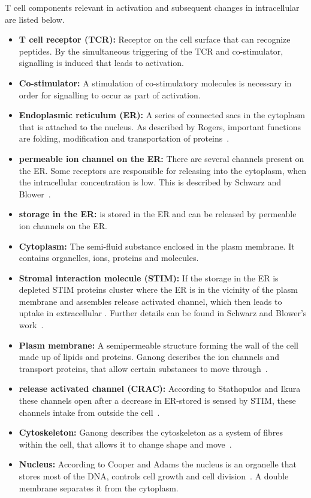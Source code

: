 T cell components relevant in activation and subsequent changes in intracellular \Calcium are listed below.

\begin{itemize}
	\item \textbf{T cell receptor (TCR):} Receptor on the cell surface that can recognize peptides. By the simultaneous triggering of the TCR and co-stimulator, signalling is induced that leads to activation.
	\item \textbf{Co-stimulator:} A stimulation of co-stimulatory molecules is necessary in order for signalling to occur as part of activation.
	\item \textbf{Endoplasmic reticulum (ER):} A series of connected sacs in the cytoplasm that is attached to the nucleus. As described by Rogers, important functions are folding, modification and transportation of proteins~\cite{Rogers2024}.
	\item \textbf{\Calcium permeable ion channel on the ER:} There are several \Calcium channels present on the ER. Some receptors are responsible for releasing \Calcium into the cytoplasm, when the intracellular \Calcium concentration is low. This is described by Schwarz and Blower~\cite{Schwarz2016}.
	\item \textbf{\Calcium storage in the ER:} \Calcium is stored in the ER and can be released by \Calcium permeable ion channels on the ER.
	\item \textbf{Cytoplasm:} The semi-fluid substance enclosed in the plasm membrane. It contains organelles, ions, proteins and molecules.
	\item \textbf{Stromal interaction molecule (STIM):} If the \Calcium storage in the ER is depleted STIM proteins cluster where the ER is in the vicinity of the plasm membrane and assembles \Calcium release activated \Calcium channel, which then leads to uptake in extracellular \Calcium. Further details can be found in Schwarz and Blower's work~\cite{Schwarz2016}.
	\item \textbf{Plasm membrane:} A semipermeable structure forming the wall of the cell made up of lipids and proteins. Ganong describes the ion channels and transport proteins, that allow certain substances to move through~\cite{Ganong2012}.
	\item \textbf{\Calcium release activated \Calcium channel (CRAC):} According to Stathopulos and Ikura these channels open after a decrease in ER-stored \Calcium is sensed by STIM, these channels intake \Calcium from outside the cell~\cite{Stathopulos2013}.
	\item \textbf{Cytoskeleton:} Ganong describes the cytoskeleton as a system of fibres within the cell, that allows it to change shape and move~\cite{Ganong2012}.
	\item \textbf{Nucleus:} According to Cooper and Adams the nucleus is an organelle that stores most of the DNA, controls cell growth and cell division~\cite{cooper2022}. A double membrane separates it from the cytoplasm.
\end{itemize}

